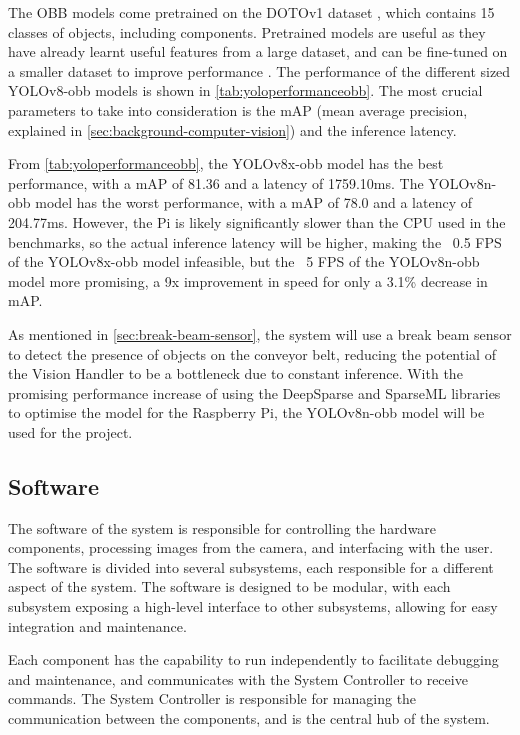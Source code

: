 The OBB models come pretrained on the DOTOv1 dataset \cite{9560031}, which contains 15 classes of objects, including components. Pretrained models are useful as they have already learnt useful features from a large dataset, and can be fine-tuned on a smaller dataset to improve performance \cite{pretrainedmodels}. The performance of the different sized YOLOv8-obb models is shown in \autoref{tab:yoloperformanceobb}. The most crucial parameters to take into consideration is the mAP (mean average precision, explained in \autoref{sec:background-computer-vision}) and the inference latency.

From \autoref{tab:yoloperformanceobb}, the YOLOv8x-obb model has the best performance, with a mAP of 81.36 and a latency of 1759.10ms. The YOLOv8n-obb model has the worst performance, with a mAP of 78.0 and a latency of 204.77ms. However, the Pi is likely significantly slower than the CPU used in the benchmarks, so the actual inference latency will be higher, making the ~0.5 FPS of the YOLOv8x-obb model infeasible, but the ~5 FPS of the YOLOv8n-obb model more promising, a 9x improvement in speed for only a 3.1\% decrease in mAP. 

As mentioned in \autoref{sec:break-beam-sensor}, the system will use a break beam sensor to detect the presence of objects on the conveyor belt, reducing the potential of the Vision Handler to be a bottleneck due to constant inference. With the promising performance increase of using the DeepSparse \cite{deepsparse} and SparseML \cite{sparseml} libraries to optimise the model for the Raspberry Pi, the YOLOv8n-obb model will be used for the project.

\subsection{Software}
\label{sec:electronics-and-software-integration}
The software of the system is responsible for controlling the hardware components, processing images from the camera, and interfacing with the user. The software is divided into several subsystems, each responsible for a different aspect of the system. The software is designed to be modular, with each subsystem exposing a high-level interface to other subsystems, allowing for easy integration and maintenance.

Each component has the capability to run independently to facilitate debugging and maintenance, and communicates with the System Controller to receive commands. The System Controller is responsible for managing the communication between the components, and is the central hub of the system.

